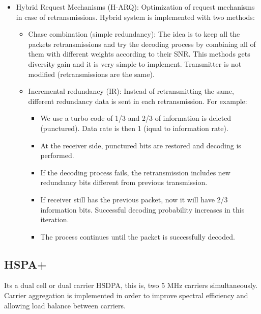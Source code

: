 \documentclass[
	12pt,
	twoside
]{book}
\begin{document}
\begin{itemize}
{\begin{itemize}
{				\begin{figure}[H]
					\centering
					\texttt{[image: Imágenes/Tema 4/HSDPA resources assignment.png]}
					\caption{
						\label{fig:unit4_HDSPA_resources}
						HSDPA resources assignment
					}
				\end{figure}
			}
			\item {
				Hybrid Request Mechanisms (H-ARQ): Optimization of request mechanisms in case of retransmissions. Hybrid system is implemented with two methods:
				\begin{itemize}
					\item Chase combination (simple redundancy): The idea is to keep all the packets retransmissions and try the decoding process by combining all of them with different weights according to their SNR. This methods gets diversity gain and it is very simple to implement. Transmitter is not modified (retransmissions are the same).
					\item {
						Incremental redundancy (IR): Instead of retransmitting the same, different redundancy data is sent in each retransmission. For example:
						\begin{itemize}
							\item We use a turbo code of 1/3 and 2/3 of information is deleted (punctured). Data rate is then 1 (iqual to information rate).
							\item At the receiver side, punctured bits are restored and decoding is performed.
							\item If the decoding process fails, the retransmission includes new redundancy bits different from previous transmission.
							\item If receiver still has the previous packet, now it will have 2/3 information bits. Successful decoding probability increases in this iteration.
							\item The process continues until the packet is successfully decoded.
						\end{itemize}
					}
				\end{itemize}
			}
		\end{itemize}
	}
\end{itemize}

\subsection{HSPA+}

Its a dual cell or dual carrier HSDPA, this is, two 5 MHz carriers simultaneously. Carrier aggregation is implemented in order to improve spectral efficiency and allowing load balance between carriers.
\end{document}
